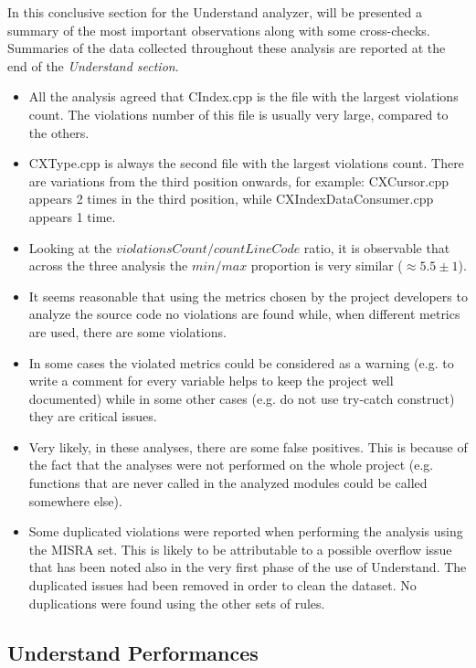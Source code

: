 In this conclusive section for the Understand analyzer, will be presented a summary of the most important observations along with some cross-checks. Summaries of the data collected throughout these analysis are reported at the end of the \textsl{Understand section}.\newline
\begin{itemize}

	\item All the analysis agreed that CIndex.cpp is the file with the largest violations count. The violations number of this file is usually very large, compared to the others.
	\item CXType.cpp is always the second file with the largest violations count. There are variations from the third position onwards, for example: CXCursor.cpp appears 2 times in the third position, while CXIndexDataConsumer.cpp appears 1 time.
	\item Looking at the $violationsCount/countLineCode$ ratio, it is observable that across the three analysis the $min/max$ proportion is very similar ($\approx 5.5 \pm 1$).
	\item It seems reasonable that using the metrics chosen by the project developers to analyze the source code no violations are found while, when different metrics are used, there are some violations.
	\item In some cases the violated metrics could be considered as a warning (e.g. to write a comment for every variable helps to keep the project well documented) while in some other cases (e.g. do not use try-catch construct) they are critical issues.
	\item Very likely, in these analyses, there are some false positives. This is because of the fact that the analyses were not performed on the whole project (e.g. functions that are never called in the analyzed modules could be called somewhere else).
	\item Some duplicated violations were reported when performing the analysis using the MISRA set. This is likely to be attributable to a possible overflow issue that has been noted also in the very first phase of the use of Understand. The duplicated issues had been removed in order to clean the dataset. No duplications were found using the other sets of rules.
\end{itemize}

\subsection{Understand Performances}

